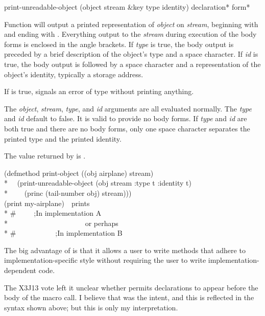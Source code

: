 \begin{defmac}
print-unreadable-object (object stream &key type identity) 
  {declaration}* {form}*

    Function will output a printed representation of \emph{object} on \emph{stream},
    beginning with
    \cd{\#<} and ending with \cdf{>}.  Everything output to the \emph{stream} during
    execution of the body
    forms is enclosed in the angle brackets.  If \emph{type} is true, the body
    output is preceded by a brief description of the object's type and a
    space character.  If \emph{id} is true, the body output is followed by
    a space character and a representation of the object's identity,
    typically a storage address.

    If  is true,  signals an error
    of type  without printing anything.

    The \emph{object}, \emph{stream}, \emph{type}, and \emph{id} arguments are all evaluated
    normally.  The \emph{type} and \emph{id} default to false.  It is valid to provide
    no body forms.  If \emph{type} and \emph{id} are both true and there are no
    body forms, only one space character separates the printed type and the printed identity.

    The value returned by  is .
\begin{lisp}
(defmethod print-object ((obj airplane) stream) \\*
~~(print-unreadable-object (obj stream :type t :identity t) \\*
~~~~(princ (tail-number obj) stream))) \\
(print my-airplane)~~\textrm{prints} \\*
\#<Airplane NW0773 777500123135>~~~~~;\textrm{In implementation A} \\*
~~~~~~~~~~~~~~~~~~~~~\textrm{or perhaps} \\*
\#<FAA:AIRPLANE NW0773 17>~~~~~~~~~~~;\textrm{In implementation B}
\end{lisp}
The big advantage of
 is that it allows a user to write  methods that
  adhere to implementation-specific style without requiring the user to write
  implementation-dependent code.

The X3J13 vote left it unclear whether 
permits declarations to appear before the body of the macro call.
I believe that was the intent, and this is reflected in the syntax shown above;
but this is only my interpretation.
\end{defmac}

